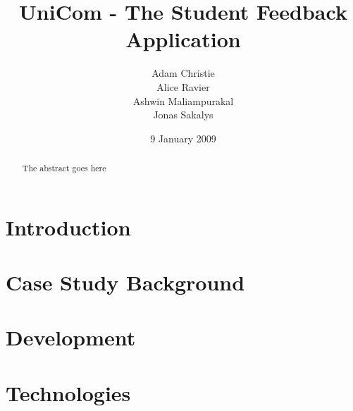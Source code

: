 \documentclass{l3proj}
\begin{document}
\title{UniCom - The Student Feedback Application}

\author{Adam Christie \\
        Alice Ravier \\
        Ashwin Maliampurakal \\
        Jonas Sakalys}

\date{9 January 2009}

\maketitle

\begin{abstract}

The abstract goes here

\end{abstract}

\educationalconsent

\newpage

\section{Introduction}



\newpage

\section{Case Study Background}



\newpage

\section{Development}



\newpage

\section{Technologies}
\end{document}
